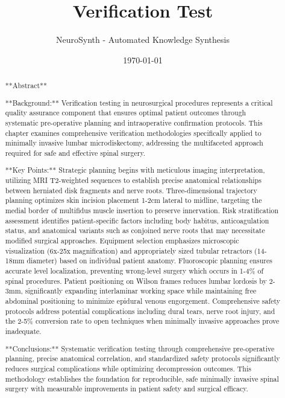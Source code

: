 \documentclass[12pt,a4paper]{article}
\title{Verification Test}
\author{NeuroSynth - Automated Knowledge Synthesis}
\date{\today}
\begin{document}
\maketitle


\begin{abstract}
**Abstract**

**Background:** Verification testing in neurosurgical procedures represents a critical quality assurance component that ensures optimal patient outcomes through systematic pre-operative planning and intraoperative confirmation protocols. This chapter examines comprehensive verification methodologies specifically applied to minimally invasive lumbar microdiskectomy, addressing the multifaceted approach required for safe and effective spinal surgery.

**Key Points:** Strategic planning begins with meticulous imaging interpretation, utilizing MRI T2-weighted sequences to establish precise anatomical relationships between herniated disk fragments and nerve roots. Three-dimensional trajectory planning optimizes skin incision placement 1-2cm lateral to midline, targeting the medial border of multifidus muscle insertion to preserve innervation. Risk stratification assessment identifies patient-specific factors including body habitus, anticoagulation status, and anatomical variants such as conjoined nerve roots that may necessitate modified surgical approaches. Equipment selection emphasizes microscopic visualization (6x-25x magnification) and appropriately sized tubular retractors (14-18mm diameter) based on individual patient anatomy. Fluoroscopic planning ensures accurate level localization, preventing wrong-level surgery which occurs in 1-4\% of spinal procedures. Patient positioning on Wilson frames reduces lumbar lordosis by 2-3mm, significantly expanding interlaminar working space while maintaining free abdominal positioning to minimize epidural venous engorgement. Comprehensive safety protocols address potential complications including dural tears, nerve root injury, and the 2-5\% conversion rate to open techniques when minimally invasive approaches prove inadequate.

**Conclusions:** Systematic verification testing through comprehensive pre-operative planning, precise anatomical correlation, and standardized safety protocols significantly reduces surgical complications while optimizing decompression outcomes. This methodology establishes the foundation for reproducible, safe minimally invasive spinal surgery with measurable improvements in patient safety and surgical efficacy.
\end{abstract}
\end{document}
